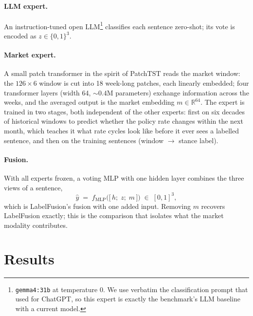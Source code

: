 \documentclass[11pt]{article}
\newcommand{\lf}{LabelFusion}
\begin{document}
\paragraph{LLM expert.}
An instruction-tuned open LLM\footnote{\texttt{gemma4:31b} at temperature 0. We use verbatim the classification prompt that \citet{shah2023trillion} used for ChatGPT, so this expert is exactly the benchmark's LLM baseline with a current model.} classifies each sentence zero-shot; its vote is encoded as $z \in \{0,1\}^{3}$.

\paragraph{Market expert.}
A small patch transformer in the spirit of PatchTST \citep{nie2023patchtst} reads the market window: the $126 \times 6$ window is cut into 18 week-long patches, each linearly embedded; four transformer layers (width 64, ${\sim}0.4$M parameters) exchange information across the weeks, and the averaged output is the market embedding $m \in \mathbb{R}^{64}$. The expert is trained in two stages, both independent of the other experts: first on six decades of historical windows to predict whether the policy rate changes within the next month, which teaches it what rate cycles look like before it ever sees a labelled sentence, and then on the training sentences (window $\rightarrow$ stance label).

\paragraph{Fusion.}
With all experts frozen, a voting MLP with one hidden layer combines the three views of a sentence,
\begin{equation}
\hat{y} \;=\; f_{\mathrm{MLP}}\big(\big[\,h;\; z;\; m\,\big]\big) \;\in\; [0,1]^{3},
\label{eq:fusion}
\end{equation}
which is \lf{}'s fusion with one added input. Removing $m$ recovers \lf{} exactly; this is the comparison that isolates what the market modality contributes.


\section{Results}
\label{sec:results}
\end{document}
